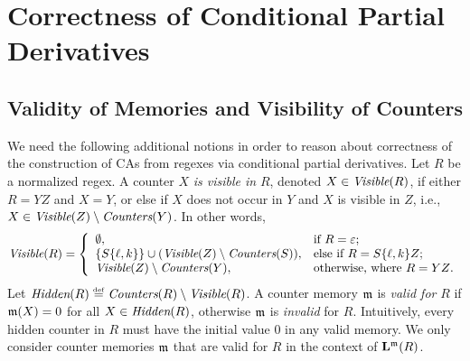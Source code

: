 \section{Correctness of Conditional Partial Derivatives}

\subsection{Validity of Memories and Visibility of Counters}


We need the following additional notions in order to reason about correctness of
the construction of CAs from regexes via conditional partial derivatives.
%
Let $R$ be a normalized regex. 
%
A counter $X$ \emph{is visible in} $R$, denoted
$X\in\textit{Visible}(R)$, if either $R=YZ$ and $X=Y$, or else if
$X$ does not occur in $Y$ and $X$ is visible in $Z$, i.e.,
$X\in\textit{Visible}(Z)\setminus\textit{Counters}(Y)$. In other words,
%
\[
\textit{Visible}(R)
=
\left\{
\begin{array}{ll}
  \emptyset, &\textrm{if $R=\varepsilon$;}\\
  \{S\{\ell,k\}\}\cup(\textit{Visible}(Z)\setminus\textit{Counters}(S)), &\textrm{else if $R=S\{\ell,k\}Z$;}\\
  \textit{Visible}(Z)\setminus\textit{Counters}(Y), & \textrm{otherwise, where $R=YZ$.}
\end{array}
\right.
\]
Let
$\HIDDEN{R}\eqdef\COUNTERS{R}\setminus\VISIBLE{R}$.  A counter memory
$\mathfrak{m}$ is \emph{valid for} $R$ if $\mathfrak{m}(X)=0$ for all
$X\in\textit{Hidden}(R)$, otherwise $\mathfrak{m}$ is \emph{invalid} for $R$.
Intuitively, every hidden counter in $R$ must have the initial value
0 in any valid memory.  We only consider counter memories $\mathfrak{m}$ that
are valid for $R$ in the context of $\mathbf{L}^{\mathfrak{m}}(R)$.

